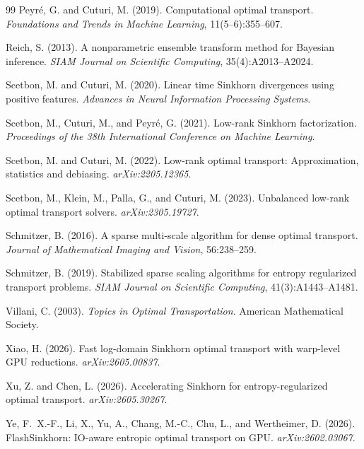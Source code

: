 \documentclass[11pt]{article}
\begin{document}
\begin{thebibliography}{99}
Peyr{\'e}, G. and Cuturi, M. (2019).
\newblock Computational optimal transport.
\newblock \emph{Foundations and Trends in Machine Learning}, 11(5--6):355--607.

Reich, S. (2013).
\newblock A nonparametric ensemble transform method for Bayesian inference.
\newblock \emph{SIAM Journal on Scientific Computing}, 35(4):A2013--A2024.

Scetbon, M. and Cuturi, M. (2020).
\newblock Linear time Sinkhorn divergences using positive features.
\newblock \emph{Advances in Neural Information Processing Systems}.

Scetbon, M., Cuturi, M., and Peyr{\'e}, G. (2021).
\newblock Low-rank Sinkhorn factorization.
\newblock \emph{Proceedings of the 38th International Conference on Machine
Learning}.

Scetbon, M. and Cuturi, M. (2022).
\newblock Low-rank optimal transport: Approximation, statistics and debiasing.
\newblock \emph{arXiv:2205.12365}.

Scetbon, M., Klein, M., Palla, G., and Cuturi, M. (2023).
\newblock Unbalanced low-rank optimal transport solvers.
\newblock \emph{arXiv:2305.19727}.

Schmitzer, B. (2016).
\newblock A sparse multi-scale algorithm for dense optimal transport.
\newblock \emph{Journal of Mathematical Imaging and Vision}, 56:238--259.

Schmitzer, B. (2019).
\newblock Stabilized sparse scaling algorithms for entropy regularized
transport problems.
\newblock \emph{SIAM Journal on Scientific Computing}, 41(3):A1443--A1481.

Villani, C. (2003).
\newblock \emph{Topics in Optimal Transportation}.
\newblock American Mathematical Society.

Xiao, H. (2026).
\newblock Fast log-domain Sinkhorn optimal transport with warp-level GPU
reductions.
\newblock \emph{arXiv:2605.00837}.

Xu, Z. and Chen, L. (2026).
\newblock Accelerating Sinkhorn for entropy-regularized optimal transport.
\newblock \emph{arXiv:2605.30267}.

Ye, F.~X.-F., Li, X., Yu, A., Chang, M.-C., Chu, L., and Wertheimer, D.
(2026).
\newblock FlashSinkhorn: IO-aware entropic optimal transport on GPU.
\newblock \emph{arXiv:2602.03067}.

\end{thebibliography}
\end{document}

